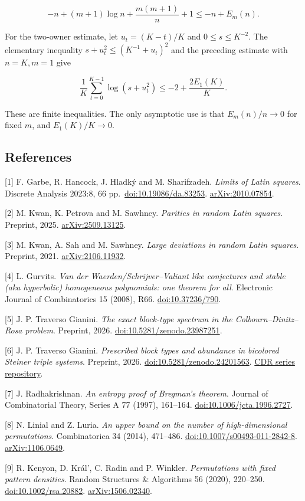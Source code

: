 \documentclass[english,11pt,a4paper]{article}
\begin{document}
\nopagebreak[4]
\[-n+(m+1)\log n+\frac{m(m+1)}n+1\le-n+E_m(n).\tag{A.2}\]

For the two-owner estimate, let \(u_t=(K-t)/K\) and \(0\le s\le K^{-2}\). The elementary inequality \(s+u_t^2\le(K^{-1}+u_t)^2\) and the preceding estimate with \(n=K,m=1\) give

\nopagebreak[4]
\[\frac1K\sum_{t=0}^{K-1}\log(s+u_t^2)
\le-2+\frac{2E_1(K)}K.\tag{A.3}\]

These are finite inequalities. The only asymptotic use is that \(E_m(n)/n\to0\) for fixed \(m\), and \(E_1(K)/K\to0\).

\subsection{References}\label{references}
\begingroup\small

{[}1{]} F. Garbe, R. Hancock, J. Hladký and M. Sharifzadeh. \emph{Limits of Latin squares}. Discrete Analysis 2023:8, 66 pp.~\href{https://doi.org/10.19086/da.83253}{doi:10.19086/da.83253}. \href{https://arxiv.org/abs/2010.07854}{arXiv:2010.07854}.

{[}2{]} M. Kwan, K. Petrova and M. Sawhney. \emph{Parities in random Latin squares}. Preprint, 2025. \href{https://arxiv.org/abs/2509.13125}{arXiv:2509.13125}.

{[}3{]} M. Kwan, A. Sah and M. Sawhney. \emph{Large deviations in random Latin squares}. Preprint, 2021. \href{https://arxiv.org/abs/2106.11932}{arXiv:2106.11932}.

{[}4{]} L. Gurvits. \emph{Van der Waerden/Schrijver--Valiant like conjectures and stable (aka hyperbolic) homogeneous polynomials: one theorem for all}. Electronic Journal of Combinatorics 15 (2008), R66. \href{https://doi.org/10.37236/790}{doi:10.37236/790}.

{[}5{]} J. P. Traverso Gianini. \emph{The exact block-type spectrum in the Colbourn--Dinitz--Rosa problem}. Preprint, 2026. \href{https://doi.org/10.5281/zenodo.23987251}{doi:10.5281/zenodo.23987251}.

{[}6{]} J. P. Traverso Gianini. \emph{Prescribed block types and abundance in bicolored Steiner triple systems}. Preprint, 2026. \href{https://doi.org/10.5281/zenodo.24201563}{doi:10.5281/zenodo.24201563}. \href{https://github.com/jtraverso/cdr-steiner-preprints}{CDR series repository}.

{[}7{]} J. Radhakrishnan. \emph{An entropy proof of Bregman's theorem}. Journal of Combinatorial Theory, Series A 77 (1997), 161--164. \href{https://doi.org/10.1006/jcta.1996.2727}{doi:10.1006/jcta.1996.2727}.

{[}8{]} N. Linial and Z. Luria. \emph{An upper bound on the number of high-dimensional permutations}. Combinatorica 34 (2014), 471--486. \href{https://doi.org/10.1007/s00493-011-2842-8}{doi:10.1007/s00493-011-2842-8}. \href{https://arxiv.org/abs/1106.0649}{arXiv:1106.0649}.

{[}9{]} R. Kenyon, D. Král', C. Radin and P. Winkler. \emph{Permutations with fixed pattern densities}. Random Structures \& Algorithms 56 (2020), 220--250. \href{https://doi.org/10.1002/rsa.20882}{doi:10.1002/rsa.20882}. \href{https://arxiv.org/abs/1506.02340}{arXiv:1506.02340}.

\endgroup
\end{document}
